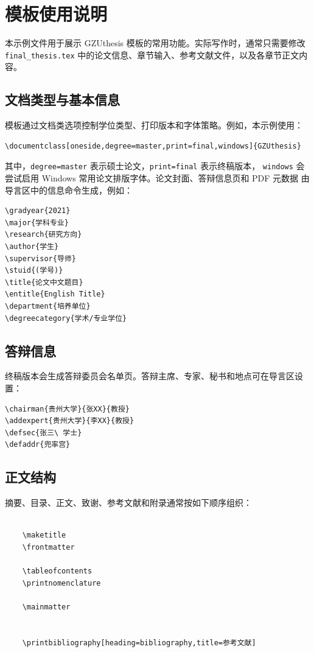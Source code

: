 \chapter{模板使用说明}

本示例文件用于展示 \textsf{GZUthesis} 模板的常用功能。实际写作时，通常只需要修改
\texttt{final\_thesis.tex} 中的论文信息、章节输入、参考文献文件，以及各章节正文内容。

\section{文档类型与基本信息}

模板通过文档类选项控制学位类型、打印版本和字体策略。例如，本示例使用：

\begin{verbatim}
\documentclass[oneside,degree=master,print=final,windows]{GZUthesis}
\end{verbatim}

其中，\texttt{degree=master} 表示硕士论文，\texttt{print=final} 表示终稿版本，
\texttt{windows} 会尝试启用 Windows 常用论文排版字体。论文封面、答辩信息页和 PDF 元数据
由导言区中的信息命令生成，例如：

\begin{verbatim}
\gradyear{2021}
\major{学科专业}
\research{研究方向}
\author{学生}
\supervisor{导师}
\stuid{(学号)}
\title{论文中文题目}
\entitle{English Title}
\department{培养单位}
\degreecategory{学术/专业学位}
\end{verbatim}

\section{答辩信息}

终稿版本会生成答辩委员会名单页。答辩主席、专家、秘书和地点可在导言区设置：

\begin{verbatim}
\chairman{贵州大学}{张XX}{教授}
\addexpert{贵州大学}{李XX}{教授}
\defsec{张三\ 学士}
\defaddr{兜率宫}
\end{verbatim}

\section{正文结构}

摘要、目录、正文、致谢、参考文献和附录通常按如下顺序组织：

\begin{verbatim}

    \maketitle
    \frontmatter
    
    \tableofcontents
    \printnomenclature

    \mainmatter
    
    
    \printbibliography[heading=bibliography,title=参考文献]
    

\end{verbatim}

